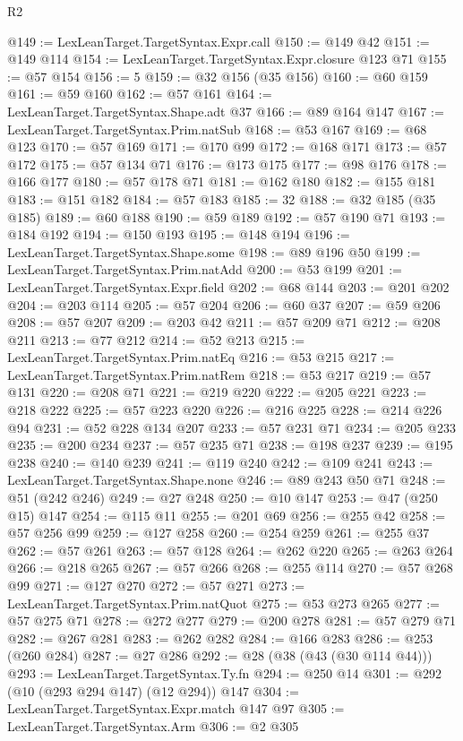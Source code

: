 \begin{lexlean}{R2}
\begin{coremodule}
@149 := LexLeanTarget.TargetSyntax.Expr.call
@150 := @149 @42
@151 := @149 @114
@154 := LexLeanTarget.TargetSyntax.Expr.closure @123 @71
@155 := @57 @154
@156 := 5
@159 := @32 @156 (@35 @156)
@160 := @60 @159
@161 := @59 @160
@162 := @57 @161
@164 := LexLeanTarget.TargetSyntax.Shape.adt @37
@166 := @89 @164 @147
@167 := LexLeanTarget.TargetSyntax.Prim.natSub
@168 := @53 @167
@169 := @68 @123
@170 := @57 @169
@171 := @170 @99
@172 := @168 @171
@173 := @57 @172
@175 := @57 @134 @71
@176 := @173 @175
@177 := @98 @176
@178 := @166 @177
@180 := @57 @178 @71
@181 := @162 @180
@182 := @155 @181
@183 := @151 @182
@184 := @57 @183
@185 := 32
@188 := @32 @185 (@35 @185)
@189 := @60 @188
@190 := @59 @189
@192 := @57 @190 @71
@193 := @184 @192
@194 := @150 @193
@195 := @148 @194
@196 := LexLeanTarget.TargetSyntax.Shape.some
@198 := @89 @196 @50
@199 := LexLeanTarget.TargetSyntax.Prim.natAdd
@200 := @53 @199
@201 := LexLeanTarget.TargetSyntax.Expr.field
@202 := @68 @144
@203 := @201 @202
@204 := @203 @114
@205 := @57 @204
@206 := @60 @37
@207 := @59 @206
@208 := @57 @207
@209 := @203 @42
@211 := @57 @209 @71
@212 := @208 @211
@213 := @77 @212
@214 := @52 @213
@215 := LexLeanTarget.TargetSyntax.Prim.natEq
@216 := @53 @215
@217 := LexLeanTarget.TargetSyntax.Prim.natRem
@218 := @53 @217
@219 := @57 @131
@220 := @208 @71
@221 := @219 @220
@222 := @205 @221
@223 := @218 @222
@225 := @57 @223 @220
@226 := @216 @225
@228 := @214 @226 @94
@231 := @52 @228 @134 @207
@233 := @57 @231 @71
@234 := @205 @233
@235 := @200 @234
@237 := @57 @235 @71
@238 := @198 @237
@239 := @195 @238
@240 := @140 @239
@241 := @119 @240
@242 := @109 @241
@243 := LexLeanTarget.TargetSyntax.Shape.none
@246 := @89 @243 @50 @71
@248 := @51 (@242 @246)
@249 := @27 @248
@250 := @10 @147
@253 := @47 (@250 @15) @147
@254 := @115 @11
@255 := @201 @69
@256 := @255 @42
@258 := @57 @256 @99
@259 := @127 @258
@260 := @254 @259
@261 := @255 @37
@262 := @57 @261
@263 := @57 @128
@264 := @262 @220
@265 := @263 @264
@266 := @218 @265
@267 := @57 @266
@268 := @255 @114
@270 := @57 @268 @99
@271 := @127 @270
@272 := @57 @271
@273 := LexLeanTarget.TargetSyntax.Prim.natQuot
@275 := @53 @273 @265
@277 := @57 @275 @71
@278 := @272 @277
@279 := @200 @278
@281 := @57 @279 @71
@282 := @267 @281
@283 := @262 @282
@284 := @166 @283
@286 := @253 (@260 @284)
@287 := @27 @286
@292 := @28 (@38 (@43 (@30 @114 @44)))
@293 := LexLeanTarget.TargetSyntax.Ty.fn
@294 := @250 @14
@301 := @292 (@10 (@293 @294 @147) (@12 @294)) @147
@304 := LexLeanTarget.TargetSyntax.Expr.match @147 @97
@305 := LexLeanTarget.TargetSyntax.Arm
@306 := @2 @305

\end{coremodule}
\end{lexlean}
